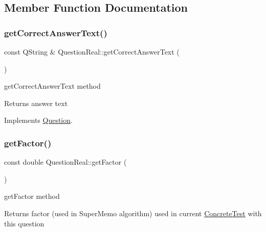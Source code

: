 \subsection{Member Function Documentation}
\mbox{\label{class_question_real_aa77cc2b576c35927d17af97f00ccf116}} 
\subsubsection{\texorpdfstring{get\+Correct\+Answer\+Text()}{getCorrectAnswerText()}}
{\footnotesize\ttfamily const Q\+String \& Question\+Real\+::get\+Correct\+Answer\+Text (\begin{DoxyParamCaption}{ }\end{DoxyParamCaption})\hspace{0.3cm}{\ttfamily [virtual]}}



get\+Correct\+Answer\+Text method 

\begin{DoxyReturn}{Returns}
answer text 
\end{DoxyReturn}


Implements \hyperlink{class_question_a3c825d4c813d2d620c46b062aef1c364}{Question}.

\mbox{\label{class_question_real_a85fa2fc7e14e9017e9dd9329aeb331ff}} 
\subsubsection{\texorpdfstring{get\+Factor()}{getFactor()}}
{\footnotesize\ttfamily const double Question\+Real\+::get\+Factor (\begin{DoxyParamCaption}{ }\end{DoxyParamCaption})\hspace{0.3cm}{\ttfamily [virtual]}}



get\+Factor method 

\begin{DoxyReturn}{Returns}
factor (used in Super\+Memo algorithm) used in current \hyperlink{class_concrete_test}{Concrete\+Test} with this question 
\end{DoxyReturn}


